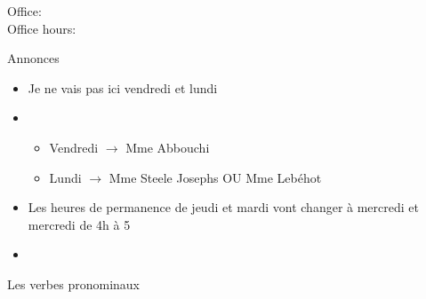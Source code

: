 \documentclass{beamer}
\subtitle[Verbes pronominaux]{Les verbes pronominaux}
\begin{document}
  \begin{frame}
    \titlepage
    \tiny{Office: \\
          Office hours: }
  \end{frame}

  \begin{frame}{Annonces}
    \begin{itemize}
      \item Je ne vais pas ici vendredi et lundi
      \item[] 
      \begin{itemize}
        \item Vendredi $\to$ Mme Abbouchi
        \item Lundi $\to$ Mme Steele Josephs OU Mme Lebéhot
      \end{itemize}
      \item Les heures de permanence de jeudi et mardi vont changer à mercredi et mercredi de 4h à 5
      \item[] 
    \end{itemize}
  \end{frame}

  \begin{frame}{Les verbes pronominaux}
    \begin{center}
      
    \end{center}
  \end{frame}
\end{document}
